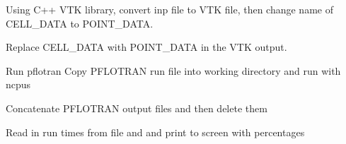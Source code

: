\documentclass[letterpaper,10pt,english]{sphinxmanual}
\begin{document}
\begin{fulllineitems}

\begin{fulllineitems}
\label{pydfnworks:pydfnworks.DFNWORKS.parse_pflotran_vtk}
Using C++ VTK library, convert inp file to VTK file, then change name of CELL\_DATA to POINT\_DATA.

\end{fulllineitems}


\begin{fulllineitems}
\label{pydfnworks:pydfnworks.DFNWORKS.parse_pflotran_vtk_python}
Replace CELL\_DATA with POINT\_DATA in the VTK output.

\end{fulllineitems}


\begin{fulllineitems}
\label{pydfnworks:pydfnworks.DFNWORKS.pflotran}
Run pflotran
Copy PFLOTRAN run file into working directory and run with ncpus

\end{fulllineitems}


\begin{fulllineitems}
\label{pydfnworks:pydfnworks.DFNWORKS.pflotran_cleanup}
Concatenate PFLOTRAN output files and then delete them

\end{fulllineitems}


\begin{fulllineitems}
\label{pydfnworks:pydfnworks.DFNWORKS.print_run_time}
Read in run times from file and and print to screen with percentages

\end{fulllineitems}


\end{fulllineitems}
\end{document}
